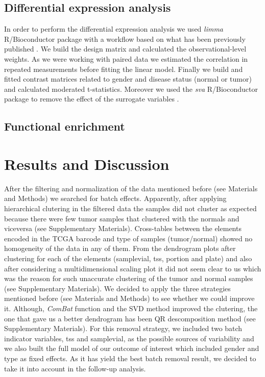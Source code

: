 \documentclass[9pt,twocolumn,twoside]{gsajnl}
\begin{document}
\subsection*{Differential expression analysis}
In order to perform the differential expression analysis we used \textit{limma} R/Bioconductor package with a workflow based on what has been previously published \citep{limma}. We build the design matrix and calculated the observational-level weights. As we were working with paired data we estimated the correlation in repeated measurements before fitting the linear model. Finally we build and fitted contrast matrices related to gender and disease status (normal or tumor) and calculated moderated t-statistics. Moreover we used the \textit{sva} R/Bioconductor package to remove the effect of the surrogate variables \citep{sva}. 

\subsection*{Functional enrichment}




\section*{Results and Discussion}

After the filtering and normalization of the data mentioned before (see Materials and Methods) we searched for batch effects. Apparently, after applying hierarchical clutering in the filtered data the samples did not cluster as expected because there were few tumor samples that clustered with the normals and viceversa (see Supplementary Materials). Cross-tables between the elements encoded in the TCGA barcode and type of samples (tumor/normal) showed no homogeneity of the data in any of them. From the dendrogram plots after clustering for each of the elements (samplevial, tss, portion and plate) and also after considering a multidimensional scaling plot it did not seem clear to us which was the reason for such unaccurate clustering of the tumor and normal samples (see Supplementary Materials). We decided to apply the three strategies mentioned before (see Materials and Methods) to see whether we could improve it. Although, \textit{ComBat} function and the SVD method improved the clutering, the one that gave us a better dendrogram has been QR descomposition method (see Supplementary Materials). For this removal strategy, we included two batch indicator variables, tss and samplevial, as the possible sources of variability and we also built the full model of our outcome of interest which included gender and type as fixed effects. As it has yield the best batch removal result, we decided to take it into account in the follow-up analysis. 
\end{document}
